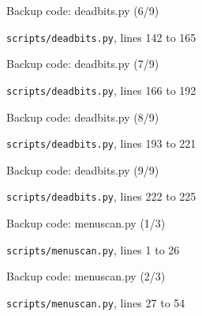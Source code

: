 \begin{frame}{Backup code: deadbits.py (6/9)}
  \vspace{0pt}\par
  {\tiny\color{lightgrey}\texttt{scripts/deadbits.py}, lines 142 to 165\par}
  
\end{frame}
\begin{frame}{Backup code: deadbits.py (7/9)}
  \vspace{0pt}\par
  {\tiny\color{lightgrey}\texttt{scripts/deadbits.py}, lines 166 to 192\par}
  
\end{frame}
\begin{frame}{Backup code: deadbits.py (8/9)}
  \vspace{0pt}\par
  {\tiny\color{lightgrey}\texttt{scripts/deadbits.py}, lines 193 to 221\par}
  
\end{frame}
\begin{frame}{Backup code: deadbits.py (9/9)}
  \vspace{0pt}\par
  {\tiny\color{lightgrey}\texttt{scripts/deadbits.py}, lines 222 to 225\par}
  
\end{frame}
\begin{frame}{Backup code: menuscan.py (1/3)}
  \vspace{0pt}\par
  {\tiny\color{lightgrey}\texttt{scripts/menuscan.py}, lines 1 to 26\par}
  
\end{frame}
\begin{frame}{Backup code: menuscan.py (2/3)}
  \vspace{0pt}\par
  {\tiny\color{lightgrey}\texttt{scripts/menuscan.py}, lines 27 to 54\par}
  
\end{frame}
